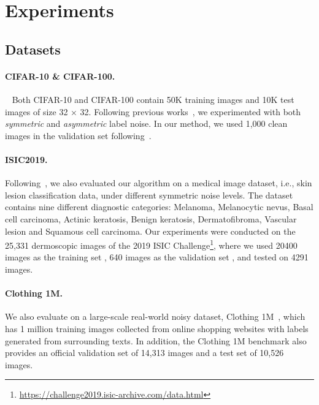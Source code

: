 \documentclass{article}
\begin{document}
    



\section{Experiments}
\label{sec:experiments}
\subsection{Datasets}

\paragraph{CIFAR-10 \& CIFAR-100.}~\label{sec:data} Both CIFAR-10 and CIFAR-100 contain 50K training images and 10K test images of size 32 × 32.
Following previous works~\cite{tanaka2018joint,kim2019nlnl,li2020dividemix}, we experimented with both \emph{symmetric} and \emph{asymmetric} label noise.
In our method, we used 1,000 clean images in the validation set  following~\cite{jiang2018mentornet,ren2018learning,shu2019meta,hendrycks2018using,zheng2021meta}.

\paragraph{ISIC2019.} Following~\cite{xue2019robust}, we also evaluated our algorithm on a medical image dataset, i.e., skin lesion classification data, under different symmetric noise levels. The dataset contains nine different diagnostic categories: Melanoma, Melanocytic nevus, Basal cell carcinoma, Actinic keratosis, Benign keratosis, Dermatofibroma, Vascular lesion and Squamous cell carcinoma.
Our experiments were conducted on the 25,331 dermoscopic images of the 2019 ISIC Challenge\footnote{\url{https://challenge2019.isic-archive.com/data.html}}, where we used 20400 images as the training set , 640 images as the validation set , and tested on 4291 images. 


\paragraph{Clothing 1M.} We also evaluate on a large-scale real-world noisy dataset, Clothing 1M~\cite{xiao2015learning}, which has 1 million training images collected from online shopping websites with labels generated
from surrounding texts.
In addition, the Clothing 1M benchmark also provides an official validation set of 14,313  images and a test set of
10,526 images.
\end{document}
